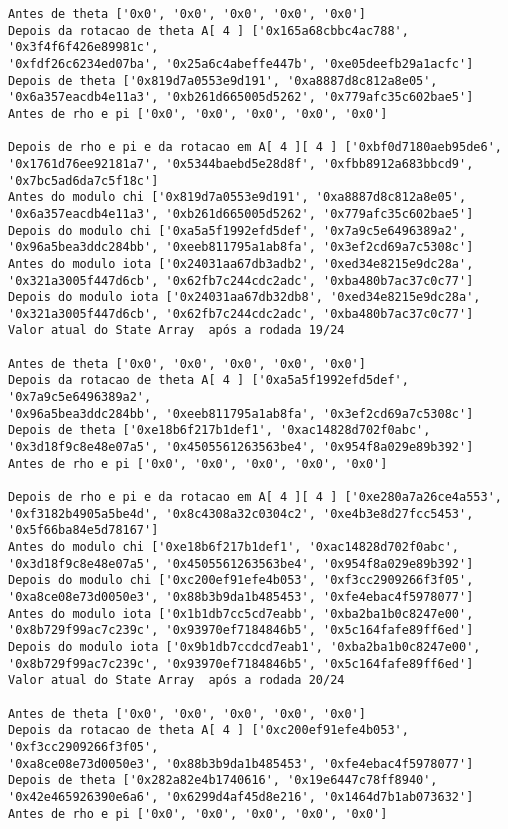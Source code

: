 \documentclass[12pt, a4paper]{article}
\begin{document}
\begin{enumerate}
\begin{enumerate}
\begin{verbatim}
Antes de theta ['0x0', '0x0', '0x0', '0x0', '0x0']
Depois da rotacao de theta A[ 4 ] ['0x165a68cbbc4ac788', '0x3f4f6f426e89981c',
'0xfdf26c6234ed07ba', '0x25a6c4abeffe447b', '0xe05deefb29a1acfc']
Depois de theta ['0x819d7a0553e9d191', '0xa8887d8c812a8e05',
'0x6a357eacdb4e11a3', '0xb261d665005d5262', '0x779afc35c602bae5']
Antes de rho e pi ['0x0', '0x0', '0x0', '0x0', '0x0']

Depois de rho e pi e da rotacao em A[ 4 ][ 4 ] ['0xbf0d7180aeb95de6',
'0x1761d76ee92181a7', '0x5344baebd5e28d8f', '0xfbb8912a683bbcd9',
'0x7bc5ad6da7c5f18c']
Antes do modulo chi ['0x819d7a0553e9d191', '0xa8887d8c812a8e05',
'0x6a357eacdb4e11a3', '0xb261d665005d5262', '0x779afc35c602bae5']
Depois do modulo chi ['0xa5a5f1992efd5def', '0x7a9c5e6496389a2',
'0x96a5bea3ddc284bb', '0xeeb811795a1ab8fa', '0x3ef2cd69a7c5308c']
Antes do modulo iota ['0x24031aa67db3adb2', '0xed34e8215e9dc28a',
'0x321a3005f447d6cb', '0x62fb7c244cdc2adc', '0xba480b7ac37c0c77']
Depois do modulo iota ['0x24031aa67db32db8', '0xed34e8215e9dc28a',
'0x321a3005f447d6cb', '0x62fb7c244cdc2adc', '0xba480b7ac37c0c77']
Valor atual do State Array  após a rodada 19/24

Antes de theta ['0x0', '0x0', '0x0', '0x0', '0x0']
Depois da rotacao de theta A[ 4 ] ['0xa5a5f1992efd5def', '0x7a9c5e6496389a2',
'0x96a5bea3ddc284bb', '0xeeb811795a1ab8fa', '0x3ef2cd69a7c5308c']
Depois de theta ['0xe18b6f217b1def1', '0xac14828d702f0abc',
'0x3d18f9c8e48e07a5', '0x4505561263563be4', '0x954f8a029e89b392']
Antes de rho e pi ['0x0', '0x0', '0x0', '0x0', '0x0']

Depois de rho e pi e da rotacao em A[ 4 ][ 4 ] ['0xe280a7a26ce4a553',
'0xf3182b4905a5be4d', '0x8c4308a32c0304c2', '0xe4b3e8d27fcc5453',
'0x5f66ba84e5d78167']
Antes do modulo chi ['0xe18b6f217b1def1', '0xac14828d702f0abc',
'0x3d18f9c8e48e07a5', '0x4505561263563be4', '0x954f8a029e89b392']
Depois do modulo chi ['0xc200ef91efe4b053', '0xf3cc2909266f3f05',
'0xa8ce08e73d0050e3', '0x88b3b9da1b485453', '0xfe4ebac4f5978077']
Antes do modulo iota ['0x1b1db7cc5cd7eabb', '0xba2ba1b0c8247e00',
'0x8b729f99ac7c239c', '0x93970ef7184846b5', '0x5c164fafe89ff6ed']
Depois do modulo iota ['0x9b1db7ccdcd7eab1', '0xba2ba1b0c8247e00',
'0x8b729f99ac7c239c', '0x93970ef7184846b5', '0x5c164fafe89ff6ed']
Valor atual do State Array  após a rodada 20/24

Antes de theta ['0x0', '0x0', '0x0', '0x0', '0x0']
Depois da rotacao de theta A[ 4 ] ['0xc200ef91efe4b053', '0xf3cc2909266f3f05',
'0xa8ce08e73d0050e3', '0x88b3b9da1b485453', '0xfe4ebac4f5978077']
Depois de theta ['0x282a82e4b1740616', '0x19e6447c78ff8940',
'0x42e465926390e6a6', '0x6299d4af45d8e216', '0x1464d7b1ab073632']
Antes de rho e pi ['0x0', '0x0', '0x0', '0x0', '0x0']


\end{verbatim}
\end{enumerate}
\end{enumerate}
\end{document}
